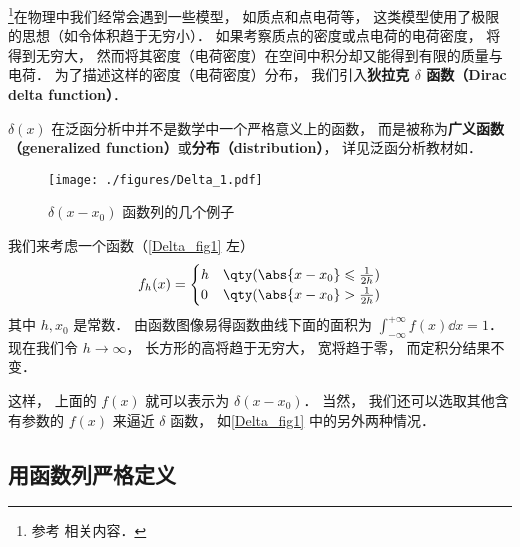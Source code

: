 
\begin{issues}
\issueTODO
\end{issues}

\footnote{参考 \cite{Arfken} 相关内容．}在物理中我们经常会遇到一些模型， 如质点和点电荷等， 这类模型使用了极限的思想（如令体积趋于无穷小）． 如果考察质点的密度或点电荷的电荷密度， 将得到无穷大， 然而将其密度（电荷密度）在空间中积分却又能得到有限的质量与电荷． 为了描述这样的密度（电荷密度）分布， 我们引入\textbf{狄拉克 $\delta$ 函数（Dirac delta function）}．

$\delta(x)$ 在泛函分析中并不是数学中一个严格意义上的函数， 而是被称为\textbf{广义函数（generalized function）}或\textbf{分布（distribution）}， 详见泛函分析教材如\cite{Zeidler}．

\begin{figure}[ht]
\centering
\texttt{[image: ./figures/Delta\_1.pdf]}
\caption{$\delta(x - x_0)$ 函数列的几个例子} \label{Delta_fig1}
\end{figure}

我们来考虑一个函数（\autoref{Delta_fig1} 左）
\begin{equation}\label{Delta_eq6}
f_h(x) =
\begin{cases}
h & \qty( \abs{x - x_0} \leqslant \frac{1}{2h} )\\
0 & \qty( \abs{x - x_0} > \frac{1}{2h} )
\end{cases}
\end{equation}
其中 $h, x_0$ 是常数． 由函数图像易得函数曲线下面的面积为 $\int_{-\infty}^{+\infty} f(x) \dd{x} = 1$． 现在我们令 $h \to \infty$， 长方形的高将趋于无穷大， 宽将趋于零， 而定积分结果不变．

这样， 上面的 $f(x)$ 就可以表示为 $\delta(x - x_0)$． 当然， 我们还可以选取其他含有参数的 $f(x)$ 来逼近 $\delta$ 函数， 如\autoref{Delta_fig1} 中的另外两种情况．

\subsection{用函数列严格定义}

